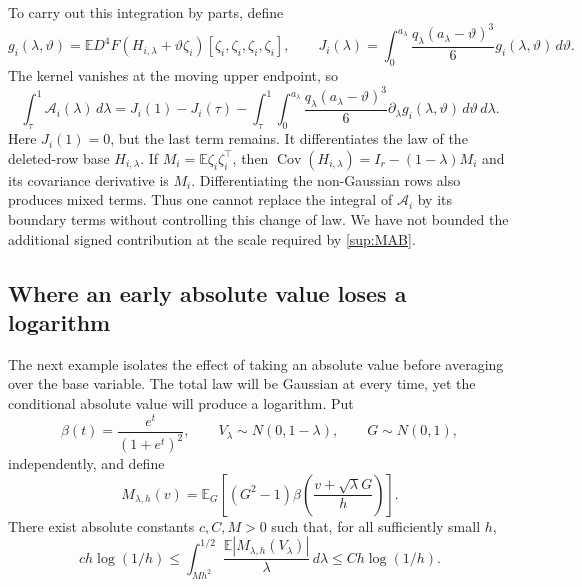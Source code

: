 \documentclass[11pt,a4paper]{article}
\theoremstyle{remark}
\newcommand{\E}{\mathbb E}
\newcommand{\Cov}{\operatorname{Cov}}
\newcommand{\dd}{\,d}
\begin{document}
To carry out this integration by parts, define
\[
 g_i(\lambda,\vartheta)
 =\E D^4F(H_{i,\lambda}+\vartheta\zeta_i)
        [\zeta_i,\zeta_i,\zeta_i,\zeta_i],
 \qquad
 J_i(\lambda)=\int_0^{a_\lambda}
     \frac{q_\lambda(a_\lambda-\vartheta)^3}{6}
     g_i(\lambda,\vartheta)\dd\vartheta.
\]
The kernel vanishes at the moving upper endpoint, so
\begin{equation}
 \int_\tau^1\mathcal A_i(\lambda)\dd\lambda
 =J_i(1)-J_i(\tau)
 -\int_\tau^1\int_0^{a_\lambda}
   \frac{q_\lambda(a_\lambda-\vartheta)^3}{6}
   \partial_\lambda g_i(\lambda,\vartheta)
   \dd\vartheta\dd\lambda.
 \label{sup:primitive-correction}
\end{equation}
Here \(J_i(1)=0\), but the last term remains. It differentiates the law
of the deleted-row base \(H_{i,\lambda}\). If
\(M_i=\E\zeta_i\zeta_i^\top\), then
\(\Cov(H_{i,\lambda})=I_r-(1-\lambda)M_i\) and its covariance
derivative is \(M_i\). Differentiating the non-Gaussian rows also
produces mixed terms. Thus one cannot replace the integral of
\(\mathcal A_i\) by its boundary terms without controlling this change
of law. We have not bounded the additional signed contribution at the
scale required by \eqref{sup:MAB}.

\subsection{Where an early absolute value loses a logarithm}
\label{sup:conditional-example}

The next example isolates the effect of taking an absolute value
before averaging over the base variable. The total law will be
Gaussian at every time, yet the conditional absolute value will
produce a logarithm. Put
\[
 \beta(t)=\frac{e^t}{(1+e^t)^2},\qquad
 V_\lambda\sim N(0,1-\lambda),\qquad G\sim N(0,1),
\]
independently, and define
\[
 M_{\lambda,h}(v)=\E_G\left[(G^2-1)
       \beta\left(\frac{v+\sqrt\lambda G}{h}\right)\right].
\]
There exist absolute constants \(c,C,M>0\) such that, for all
sufficiently small \(h\),
\begin{equation}
 ch\log(1/h)
 \le\int_{Mh^2}^{1/2}
      \frac{\E|M_{\lambda,h}(V_\lambda)|}{\lambda}\dd\lambda
 \le Ch\log(1/h).
 \label{sup:conditional-log}
\end{equation}
\end{document}
